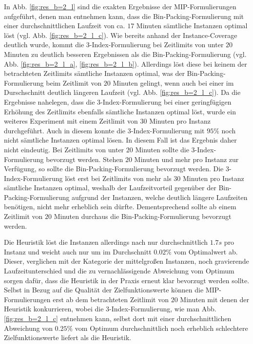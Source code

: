 In Abb. \ref{fig:res_b=2_l} sind die exakten Ergebnisse der MIP-Formulierungen aufgeführt, denen man
entnehmen kann, dass die Bin-Packing-Formulierung mit einer durchschnittlichen Laufzeit von ca. $17$ Minuten sämtliche Instanzen optimal löst (vgl. Abb. \ref{fig:res_b=2_l_c}). Wie bereits anhand der Instance-Coverage deutlich wurde,
kommt die 3-Index-Formulierung bei Zeitlimits von unter $20$ Minuten zu deutlich besseren Ergebnissen als die Bin-Packing-Formulierung (vgl. Abb. \ref{fig:res_b=2_l_a}, \ref{fig:res_b=2_l_b}). Allerdings löst diese bei keinem der betrachteten Zeitlimits sämtliche Instanzen optimal, was der Bin-Packing-Formulierung beim Zeitlimit von $20$ Minuten gelingt, wenn auch bei einer im Durschschnitt deutlich längeren Laufzeit (vgl. Abb. \ref{fig:res_b=2_l_c}). Da die Ergebnisse nahelegen, dass die 3-Index-Formulierung
bei einer geringfügigen Erhöhung des Zeitlimits ebenfalls sämtliche Instanzen optimal löst, wurde ein weiteres Experiment mit einem Zeitlimit von $30$ Minuten pro Instanz durchgeführt. Auch in diesem konnte die 3-Index-Formulierung mit $95 \%$ noch nicht sämtliche Instanzen optimal lösen. In diesem Fall ist das Ergebnis daher nicht eindeutig. Bei Zeitlimits von unter $20$ Minuten sollte die 3-Index-Formulierung bevorzugt werden. Stehen $20$ Minuten und mehr pro Instanz zur Verfügung, so sollte die Bin-Packing-Formulierung bevorzugt werden. Die 3-Index-Formulierung löst erst bei Zeitlimits von mehr als $30$ Minuten pro Instanz sämtliche Instanzen optimal, weshalb der Laufzeitvorteil gegenüber der Bin-Packing-Formulierung aufgrund der Instanzen, welche deutlich längere Laufzeiten benötigen, nicht mehr erheblich sein dürfte. Dementsprechend sollte ab einem Zeitlimit von $20$ Minuten durchaus die Bin-Packing-Formulierung bevorzugt werden.

Die Heuristik löst die Instanzen allerdings nach nur durchschnittlich $1.7s$ pro Instanz und weicht auch nur um im Durchschnitt $0.02 \%$ vom Optimalwert ab. Dieser, verglichen mit der Kategorie der mittelgroßen Instanzen, noch gravierende Laufzeitunterschied und die zu vernachlässigende Abweichung vom Optimum sorgen dafür, dass die Heuristik in der Praxis erneut klar bevorzugt werden sollte. Selbst in Bezug auf die Qualität der Zielfunktionswerte können die MIP-Formulierungen erst ab dem betrachteten Zeitlimit von $20$ Minuten mit denen der Heuristik konkurrieren, wobei die 3-Index-Formulierung, wie man Abb. \ref{fig:res_b=2_l_c} entnehmen kann, selbst dort mit einer durchschnittlichen Abweichung von $0.25 \%$ vom Optimum durchschnittlich noch erheblich schlechtere Zielfunktionswerte liefert als die Heuristik.


